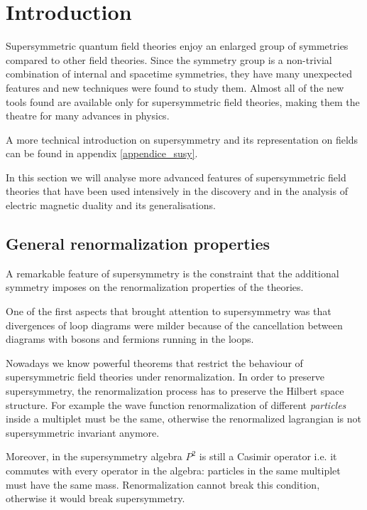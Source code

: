 

\section{Introduction}
Supersymmetric quantum field theories enjoy an enlarged group of  symmetries compared to other field theories. 
Since the symmetry group is a non-trivial combination of internal and spacetime symmetries, they have many unexpected features and new techniques were found to study them.
Almost all of the new tools found are available only for supersymmetric field theories, making them the theatre for many advances in physics. 

A more technical introduction on supersymmetry and its representation on fields can be found in appendix \ref{appendice_susy}.

In this section we will analyse more advanced features of supersymmetric field theories that have been used intensively in the discovery and in the analysis of electric magnetic duality and its generalisations.














\subsection{General renormalization properties}

A remarkable feature of supersymmetry is the constraint that the additional symmetry imposes on the renormalization properties of the theories.

One of the first aspects that brought attention to supersymmetry was that divergences of loop diagrams were milder because of the cancellation between diagrams with bosons and fermions running in the loops. 

Nowadays we know powerful theorems that restrict the behaviour of supersymmetric field theories under renormalization.
In order to preserve supersymmetry, the renormalization process has to preserve the Hilbert space structure. For example the wave function renormalization of different \emph{particles} inside a multiplet must be the same, otherwise the renormalized lagrangian is not supersymmetric invariant anymore. 

Moreover, in the supersymmetry algebra $P^2$ is still a Casimir operator i.e. it commutes with every operator in the algebra: particles in the same multiplet must have the same mass.
Renormalization cannot break this condition, otherwise it would break supersymmetry.

